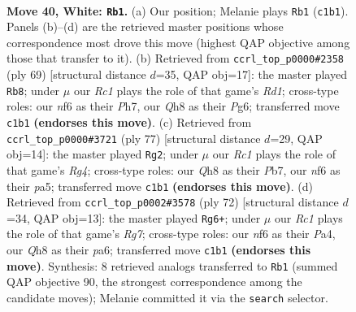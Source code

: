 \documentclass[11pt]{article}
\begin{document}
\clearpage

\begin{figure}[p]\centering
\begin{subfigure}{0.46\textwidth}\centering
\resizebox{\linewidth}{!}{%
\newchessgame
\chessboard[
  setfen={7Q/5k2/5n2/1b1P4/8/r3p1p1/P1P3P1/2R1K3 w - - 0 40},
  showmover=false,
  pgfstyle=straightmove, color=movearrow, markmove={c1-b1}
]}
\caption{}
\end{subfigure}\hfill
\begin{subfigure}{0.46\textwidth}\centering
\resizebox{\linewidth}{!}{%
\newchessgame
\chessboard[
  setfen={3r4/5p1p/p2k2p1/R2P4/5K2/3P3P/6P1/8 b - - 8 35},
  showmover=false,
  pgfstyle=straightmove, color=movearrow, markmove={d8-b8}
]}
\caption{}
\end{subfigure}
\\[4pt]
\begin{subfigure}{0.46\textwidth}\centering
\resizebox{\linewidth}{!}{%
\newchessgame
\chessboard[
  setfen={6k1/1p6/8/Pp1Pnpr1/5R2/7p/1P6/1B5K b - - 0 39},
  showmover=false,
  pgfstyle=straightmove, color=movearrow, markmove={g5-g2}
]}
\caption{}
\end{subfigure}\hfill
\begin{subfigure}{0.46\textwidth}\centering
\resizebox{\linewidth}{!}{%
\newchessgame
\chessboard[
  setfen={2r5/2P3R1/pp2k3/4p3/P7/8/1PP5/6K1 w - - 1 37},
  showmover=false,
  pgfstyle=straightmove, color=movearrow, markmove={g7-g6}
]}
\caption{}
\end{subfigure}
\caption{\textbf{Move 40, White: \texttt{Rb1}.} (a) Our position; Melanie plays \texttt{Rb1} (\texttt{c1b1}). Panels (b)--(d) are the retrieved master positions whose correspondence most drove this move (highest QAP objective among those that transfer to it). (b) Retrieved from \texttt{ccrl\_top\_p0000\#2358} (ply 69) [structural distance $d$=35, QAP obj=17]: the master played \texttt{Rb8}; under $\mu$ our \emph{Rc1} plays the role of that game's \emph{Rd1}; cross-type roles: our \emph{n}f6 as their \emph{P}h7, our \emph{Q}h8 as their \emph{P}g6; transferred move \texttt{c1b1} \textbf{(endorses this move)}. (c) Retrieved from \texttt{ccrl\_top\_p0000\#3721} (ply 77) [structural distance $d$=29, QAP obj=14]: the master played \texttt{Rg2}; under $\mu$ our \emph{Rc1} plays the role of that game's \emph{Rg4}; cross-type roles: our \emph{Q}h8 as their \emph{P}b7, our \emph{n}f6 as their \emph{p}a5; transferred move \texttt{c1b1} \textbf{(endorses this move)}. (d) Retrieved from \texttt{ccrl\_top\_p0002\#3578} (ply 72) [structural distance $d$=34, QAP obj=13]: the master played \texttt{Rg6+}; under $\mu$ our \emph{Rc1} plays the role of that game's \emph{Rg7}; cross-type roles: our \emph{n}f6 as their \emph{P}a4, our \emph{Q}h8 as their \emph{p}a6; transferred move \texttt{c1b1} \textbf{(endorses this move)}. Synthesis: 8 retrieved analogs transferred to \texttt{Rb1} (summed QAP objective 90, the strongest correspondence among the candidate moves); Melanie committed it via the \texttt{search} selector.}
\label{fig:thought-m78}
\end{figure}
\end{document}
